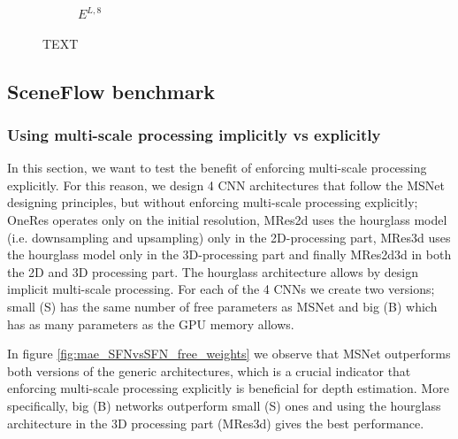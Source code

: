 \documentclass[10pt]{article}
\begin{document}
\begin{figure}[t]
{\begin{subfigure}[b]{0.28\textwidth}
        \vspace{-15pt}     
        \caption{$E^{L,8}$}
    \end{subfigure}         
}
\vspace{-15pt}
\caption{TEXT}
\label{fig:EMAPs}  
\vspace{-3pt}      
\end{figure}

\subsection{SceneFlow benchmark} \label{sec:4_2}

\subsubsection{Using multi-scale processing implicitly vs explicitly}

In this section, we want to test the benefit of enforcing multi-scale processing explicitly. For this reason, we design 4 CNN architectures that follow the MSNet designing principles, but without enforcing multi-scale processing explicitly; OneRes operates only on the initial resolution, MRes2d uses the hourglass model (i.e. downsampling and upsampling) only in the 2D-processing part, MRes3d uses the hourglass model only in the 3D-processing part and finally MRes2d3d in both the 2D and 3D processing part. The hourglass architecture allows by design implicit multi-scale processing. For each of the 4 CNNs we create two versions; small (S) has the same number of free parameters as MSNet and big (B) which has as many parameters as the GPU memory allows.

In figure \ref{fig:mae_SFNvsSFN_free_weights} we observe that MSNet outperforms both versions of the generic architectures, which is a crucial indicator that enforcing multi-scale processing explicitly is beneficial for depth estimation. More specifically, big (B) networks outperform small (S) ones and using the hourglass architecture in the 3D processing part (MRes3d) gives the best performance.
\end{document}
